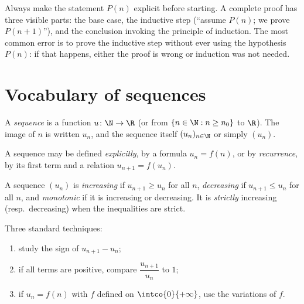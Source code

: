 \begin{method}\label{met:tle:seq:induction}
Always make the statement $P(n)$ explicit before starting. A complete proof
has three visible parts: the base case, the inductive step (``assume $P(n)$;
we prove $P(n+1)$''), and the conclusion invoking the principle of induction.
The most common error is to prove the inductive step without ever using the
hypothesis $P(n)$: if that happens, either the proof is wrong or induction was
not needed.
\end{method}

\section{Vocabulary of sequences}

\begin{definition}[Sequence]\label{def:tle:seq:sequence}
A \emph{sequence} is a function $u \colon \N \to \R$ (or from
$\{n \in \N : n \geq n_0\}$ to $\R$). The image of $n$ is written $u_n$, and
the sequence itself $(u_n)_{n\in\N}$ or simply $(u_n)$.
\end{definition}

A sequence may be defined \emph{explicitly}, by a formula $u_n = f(n)$, or by
\emph{recurrence}, by its first term and a relation $u_{n+1} = f(u_n)$.

\begin{definition}[Monotonicity]\label{def:tle:seq:monotonic}
A sequence $(u_n)$ is \emph{increasing} if
$u_{n+1} \geq u_n$ for all $n$, \emph{decreasing} if $u_{n+1} \leq u_n$ for
all $n$, and \emph{monotonic} if it is increasing or decreasing. It is
\emph{strictly} increasing (resp.\ decreasing) when the inequalities are
strict.
\end{definition}

\begin{method}\label{met:tle:seq:monotonicity}
Three standard techniques:
\begin{enumerate}
  \item study the sign of $u_{n+1} - u_n$;
  \item if all terms are positive, compare $\dfrac{u_{n+1}}{u_n}$ to $1$;
  \item if $u_n = f(n)$ with $f$ defined on $\intco{0}{+\infty}$, use the
        variations of $f$.
\end{enumerate}
\end{method}

